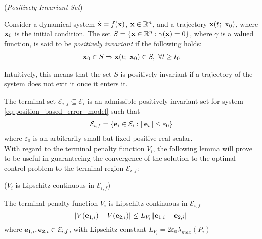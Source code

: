 \begin{bw_box}
  \begin{definition} (\textit{Positively Invariant Set})

    Consider a dynamical system $\dot{\bm{\mathbf{x}}} = f(\bm{\mathbf{x}})$,
    $\bm{\mathbf{x}} \in \mathbb{R}^n$, and a trajectory $\bm{\mathbf{x}}(t;\ \bm{\mathbf{x}}_0)$,
    where $\bm{\mathbf{x}}_0$ is the initial condition. The set
    $S = \{\bm{\mathbf{x}} \in \mathbb{R}^n : \gamma(\bm{\mathbf{x}}) = 0\}$, where
    $\gamma$ is a valued function, is said to be \textit{positively invariant}
    if the following holds:
    \begin{align}
      \vect{x}_0 \in S \Rightarrow \vect{x}(t;\ \vect{x}_0) \in S,\ \forall t \geq t_0
    \end{align}

    Intuitively, this means that the set $S$ is positively invariant if a
    trajectory of the system does not exit it once it enters it.
    \label{def:positively_invariant}
  \end{definition}
\end{bw_box}

The terminal set $\mathcal{E}_{i,f} \subseteq \mathcal{E}_i$ is an admissible
positively invariant set for system \eqref{eq:position_based_error_model}
such that
\begin{align}
  \mathcal{E}_{i,f} = \{\bm{\mathbf{e}}_i \in \mathcal{E}_i : \|\bm{\mathbf{e}}_i\| \leq \varepsilon_0 \}
\end{align}
where $\varepsilon_0$ is an arbitrarily small but fixed positive real scalar.\\

With regard to the terminal penalty function $V_i$, the following lemma will
prove to be useful in guaranteeing the convergence of the solution to the
optimal control problem to the terminal region $\mathcal{E}_{i,f}$:

\begin{bw_box}
\begin{lemma} ($V_i$ is Lipschitz continuous in $\mathcal{E}_{i,f}$)

  The terminal penalty function $V_i$ is Lipschitz continuous in
  $\mathcal{E}_{i,f}$
  $$|V(\bm{\mathbf{e}}_{1,i}) - V(\bm{\mathbf{e}}_{2,i})| \leq L_{V_i} \|\bm{\mathbf{e}}_{1,i} - \bm{\mathbf{e}}_{2,i}\|$$
  where $\bm{\mathbf{e}}_{1,i}, \bm{\mathbf{e}}_{2,i} \in \mathcal{E}_{i,f}$,
  with Lipschitz constant $L_{V_i} = 2 \varepsilon_0 \lambda_{max}(P_i)$\\

\label{lemma:V_Lipschitz_e_0}
\end{lemma}
\end{bw_box}


